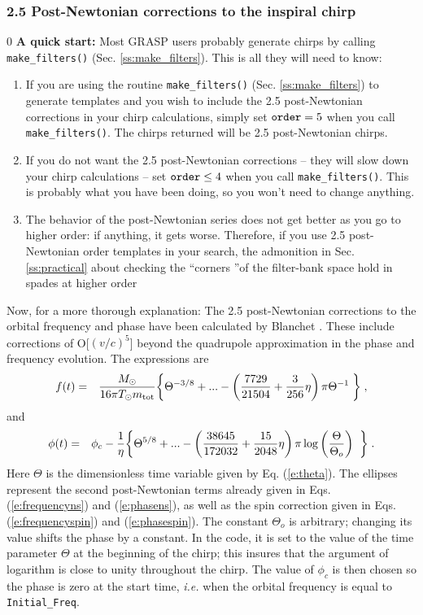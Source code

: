 \subsubsection{ 2.5 Post-Newtonian corrections to the inspiral chirp}
\label{sss:post52}
\setcounter{equation}0
\noindent
{\bf A quick start:} Most GRASP users probably
generate chirps by calling {\tt make\_filters()}
(Sec. \ref{ss:make_filters}).
This is all they  will need to know:
\begin{enumerate}
\item
If you are using the routine 
{\tt make\_filters()} (Sec. \ref{ss:make_filters})
to generate templates and you 
wish to include the 2.5 post-Newtonian corrections
in your chirp calculations,
simply set ${\tt order}=5$ when you
call {\tt make\_filters()}.
The chirps returned will be 2.5 post-Newtonian chirps.
\item
If you do not want the 2.5 post-Newtonian corrections
-- they will slow down your chirp calculations -- 
set ${\tt order} \le 4$ when you call {\tt make\_filters()}.  
This is probably what you have been doing, 
so you won't need to change anything.
\item
The behavior of the post-Newtonian series does
not get better as you go to higher order: if anything,
it gets worse.  Therefore, if you use
2.5 post-Newtonian order templates in your search,
the admonition in Sec. \ref{ss:practical} about checking the 
``corners ''of the
filter-bank space hold in spades at higher order
\end{enumerate}

Now, for a more thorough explanation:
The 2.5 post-Newtonian corrections to the
orbital frequency and phase
have been calculated by Blanchet \cite{blanchet:1996}. 
These include corrections of O[$(v/c)^5$] 
beyond the quadrupole approximation in the 
phase and frequency evolution.
The expressions are
\begin{eqnarray}
\label{e:frequencyp52}
f(t)&=& {M_\odot \over 16 \pi  T_\odot m_{\rm tot}} 
\biggl\{ \Theta^{-3/8}
+ {\rm ...}  -
\left( {7729 \over 21504 } + {3 \over 256 } \eta   \right) \pi  \Theta^{-1}
 \;\biggr\} \;,
\end{eqnarray}
and
\begin{eqnarray}
\label{e:phasep52}
\phi (t) &=&\phi_c -{1\over\eta} \biggl\{ \Theta^{5/8} +
{\rm ...}
-\left( {38645\over 172032} + {15\over 2048} \eta \right)
\pi \log \left( { \Theta \over \Theta_o } \right) \; \; \biggr\}\;.
\end{eqnarray}
Here $\Theta$ is the dimensionless time variable given by Eq. (\ref{e:theta}).
The ellipses represent the second post-Newtonian terms already given
in Eqs. (\ref{e:frequencyns}) and (\ref{e:phasens}), as well
as the spin correction given
in Eqs. (\ref{e:frequencyspin}) and (\ref{e:phasespin}).
The constant $\Theta_o$ is arbitrary; changing its value
shifts the phase by a constant.  In the code, it is set to
the value of the time parameter $\Theta$ at the beginning
of the chirp; this insures that the argument of
logarithm is close to unity throughout the chirp.
The value of $\phi_c$ is then 
chosen so the phase is zero at the start time, {\it i.e.}
when the orbital frequency is equal to {\tt Initial\_Freq}.  


